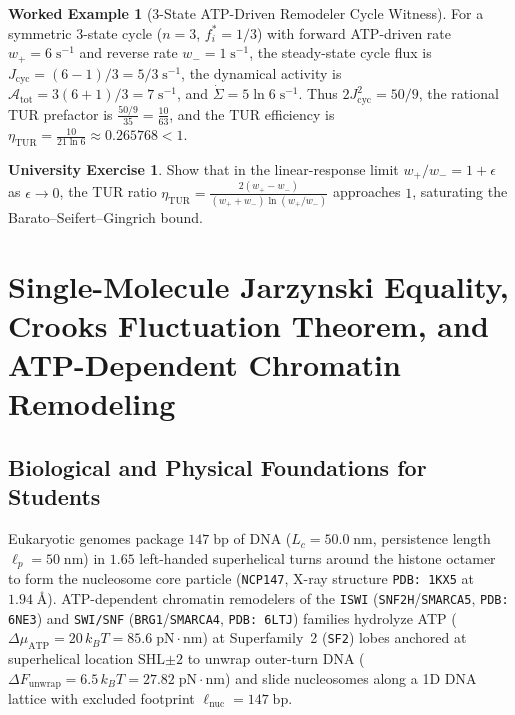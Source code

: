 \documentclass[11pt,a4paper]{article}
\theoremstyle{definition}
\newtheorem{example_box}[theorem]{Worked Example}
\newtheorem{exercise}[theorem]{University Exercise}
\theoremstyle{remark}
\begin{document}
\begin{example_box}[3-State ATP-Driven Remodeler Cycle Witness]
For a symmetric 3-state cycle ($n=3$, $f_i^* = 1/3$) with forward ATP-driven rate $w_+ = 6\;\mathrm{s}^{-1}$ and reverse rate $w_- = 1\;\mathrm{s}^{-1}$, the steady-state cycle flux is $J_{\mathrm{cyc}} = (6 - 1)/3 = 5/3\;\mathrm{s}^{-1}$, the dynamical activity is $\mathcal{A}_{\mathrm{tot}} = 3(6+1)/3 = 7\;\mathrm{s}^{-1}$, and $\dot{\Sigma} = 5\ln 6\;\mathrm{s}^{-1}$. Thus $2 J_{\mathrm{cyc}}^2 = 50/9$, the rational TUR prefactor is $\frac{50/9}{35} = \frac{10}{63}$, and the TUR efficiency is $\eta_{\mathrm{TUR}} = \frac{10}{21\ln 6} \approx 0.265768 < 1$.
\end{example_box}

\begin{exercise}
Show that in the linear-response limit $w_+ / w_- = 1 + \epsilon$ as $\epsilon \to 0$, the TUR ratio $\eta_{\mathrm{TUR}} = \frac{2(w_+ - w_-)}{(w_+ + w_-)\ln(w_+/w_-)}$ approaches $1$, saturating the Barato--Seifert--Gingrich bound.
\end{exercise}

\section{Single-Molecule Jarzynski Equality, Crooks Fluctuation Theorem, and ATP-Dependent Chromatin Remodeling}

\subsection{Biological and Physical Foundations for Students}
Eukaryotic genomes package $147\;\mathrm{bp}$ of DNA ($L_c = 50.0\;\mathrm{nm}$, persistence length $\ell_p = 50\;\mathrm{nm}$) in $1.65$ left-handed superhelical turns around the histone octamer to form the nucleosome core particle (\texttt{NCP147}, X-ray structure \texttt{PDB: 1KX5} at $1.94\;\text{\AA}$). ATP-dependent chromatin remodelers of the \texttt{ISWI} (\texttt{SNF2H}/\texttt{SMARCA5}, \texttt{PDB: 6NE3}) and \texttt{SWI/SNF} (\texttt{BRG1}/\texttt{SMARCA4}, \texttt{PDB: 6LTJ}) families hydrolyze ATP ($\Delta\mu_{\mathrm{ATP}} = 20\,k_B T = 85.6\;\mathrm{pN\cdot nm}$) at Superfamily~2 (\texttt{SF2}) lobes anchored at superhelical location $\mathrm{SHL}{\pm 2}$ to unwrap outer-turn DNA ($\Delta F_{\mathrm{unwrap}} = 6.5\,k_B T = 27.82\;\mathrm{pN\cdot nm}$) and slide nucleosomes along a 1D DNA lattice with excluded footprint $\ell_{\mathrm{nuc}} = 147\;\mathrm{bp}$.
\end{document}

